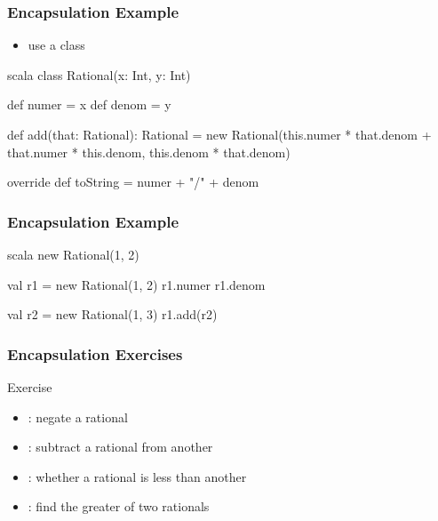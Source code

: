 \documentclass[dvipsnames]{beamer}
\theoremstyle{plain}
\begin{document}
\begin{frame}[fragile]
  \frametitle{Encapsulation Example}

  \begin{example}[Scala]
    \begin{itemize}
      \item use a class
    \end{itemize}

    \medskip
    \begin{pygments}{scala}
class Rational(x: Int, y: Int) {
    def numer = x
    def denom = y

    def add(that: Rational): Rational =
        new Rational(this.numer * that.denom +
                         that.numer * this.denom,
                     this.denom * that.denom)

    override def toString =
        numer + "/" + denom
}
    \end{pygments}
  \end{example}
\end{frame}

\begin{frame}[fragile]
  \frametitle{Encapsulation Example}

  \begin{example}[Scala]
    \begin{pygments}{scala}
new Rational(1, 2)

val r1 = new Rational(1, 2)
r1.numer
r1.denom

val r2 = new Rational(1, 3)
r1.add(r2)
    \end{pygments}
  \end{example}
\end{frame}

\begin{frame}
  \frametitle{Encapsulation Exercises}

  \begin{block}{Exercise}
    \begin{itemize}
      \item {}: negate a rational
      \item {}: subtract a rational from another
      \item {}: whether a rational is less than another
      \item {}: find the greater of two rationals
    \end{itemize}
  \end{block}
\end{frame}
\end{document}
